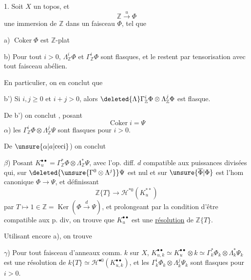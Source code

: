1. Soit $X$ un topos, et
\[
\mathbb{Z}\xrightarrow{u}\Phi
\]
une immersion de $\mathbb{Z}$ dans un faisceau $\Phi$, tel que

a) $\operatorname{Coker}\Phi$ est $\mathbb{Z}$-plat

b) Pour tout $i>0$, $\Lambda_{\mathbb{Z}}^i\Phi$ et $\Gamma_{\mathbb{Z}}^i\Phi$ sont flasques, et le restent par tensorisation avec tout faisceau abélien.

En particulier, on en conclut  que 

b') Si $i,j\geq 0$ et $i+j>0$, alors $\deleted{\Lambda}\Gamma_{\mathbb{Z}}^i\Phi\otimes\Lambda_{\mathbb{Z}}^j\Phi$ est flasque.

De b') on conclut , posant
\[
\operatorname{Coker}i=\Psi
\]
 $\alpha$) les $\Gamma_{\mathbb{Z}}^i\Phi\otimes\Lambda_{\mathbb{Z}}^j\Psi$ sont flasques pour $i>0$. 

De $\unsure{\alpha|a|\text{ceci}}$) on conclut\unsure{:}

$\beta$) Posant $K_u^{\bullet\bullet}=\Gamma_{\mathbb{Z}}^*\Phi\otimes\Lambda_{\mathbb{Z}}^*\Psi$, avec l'op. diff. \deleted{\unsure{$\delta$}} $d$ compatible aux puissances divisées qui, sur $\deleted{\unsure{\Gamma^0\otimes\Lambda^j}}\Psi$ est nul et sur $\unsure{\overline{\Phi}|\Phi}$ est l'hom canonique $\Phi\longrightarrow\Psi$, et définissant
\[
\mathbb{Z}\{T\}\longrightarrow\mathscr{H}^{*0}(K_u^{**})
\]
par $T\longmapsto 1\in\mathbb{Z}=\operatorname{Ker}(\Phi\xrightarrow{d}\Psi)$, et prolongeant par la condition d'être compatible aux p. div, on trouve que $K_u^{\bullet\bullet}$ est une \uline{résolution} de $\mathbb{Z}\{T\}$.

Utilisant encore a),  on trouve

$\gamma$) Pour tout faisceau d'anneaux comm. $k$ sur $X$, $K_{u,k}^{\bullet\bullet}\simeq K_u^{\bullet\bullet}\otimes k\simeq\Gamma_k^*\Phi_k\otimes\Lambda_k^*\Psi_k$ est une résolution de $k\{T\}\simeq\mathscr{H}^{\bullet 0}(K_{u,k}^{\bullet\bullet})$, et les $\Gamma_k^i\Phi_k\otimes\Lambda_k^j\Psi_k$ sont flasques pour $i>0$.
